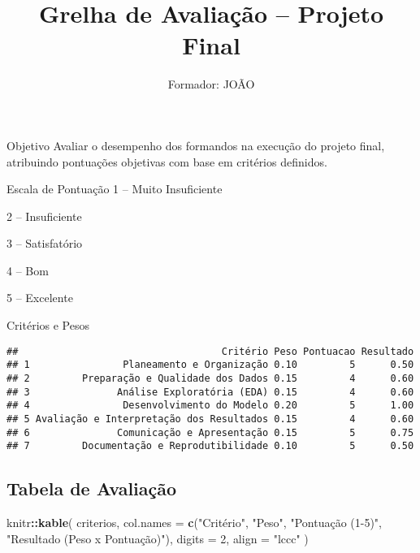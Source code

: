 \documentclass[
]{article}
\title{Grelha de Avaliação -- Projeto Final}
\author{Formador: JOÃO}
\date{}
\newenvironment{Shaded}{\begin{snugshade}}{\end{snugshade}}
\newcommand{\AttributeTok}[1]{\textcolor[rgb]{0.13,0.29,0.53}{#1}}
\newcommand{\DecValTok}[1]{\textcolor[rgb]{0.00,0.00,0.81}{#1}}
\newcommand{\FunctionTok}[1]{\textcolor[rgb]{0.13,0.29,0.53}{\textbf{#1}}}
\newcommand{\NormalTok}[1]{#1}
\newcommand{\SpecialCharTok}[1]{\textcolor[rgb]{0.81,0.36,0.00}{\textbf{#1}}}
\newcommand{\StringTok}[1]{\textcolor[rgb]{0.31,0.60,0.02}{#1}}
\begin{document}
\maketitle

Objetivo Avaliar o desempenho dos formandos na execução do projeto
final, atribuindo pontuações objetivas com base em critérios definidos.

Escala de Pontuação 1 -- Muito Insuficiente

2 -- Insuficiente

3 -- Satisfatório

4 -- Bom

5 -- Excelente

Critérios e Pesos

\begin{verbatim}
##                                   Critério Peso Pontuacao Resultado
## 1                Planeamento e Organização 0.10         5      0.50
## 2         Preparação e Qualidade dos Dados 0.15         4      0.60
## 3               Análise Exploratória (EDA) 0.15         4      0.60
## 4                Desenvolvimento do Modelo 0.20         5      1.00
## 5 Avaliação e Interpretação dos Resultados 0.15         4      0.60
## 6               Comunicação e Apresentação 0.15         5      0.75
## 7         Documentação e Reprodutibilidade 0.10         5      0.50
\end{verbatim}

\subsection{Tabela de Avaliação}\label{tabela-de-avaliauxe7uxe3o}

\begin{Shaded}
\begin{Highlighting}[]
\NormalTok{knitr}\SpecialCharTok{::}\FunctionTok{kable}\NormalTok{(}
\NormalTok{  criterios,}
  \AttributeTok{col.names =} \FunctionTok{c}\NormalTok{(}\StringTok{"Critério"}\NormalTok{, }\StringTok{"Peso"}\NormalTok{, }\StringTok{"Pontuação (1{-}5)"}\NormalTok{, }\StringTok{"Resultado (Peso x Pontuação)"}\NormalTok{),}
  \AttributeTok{digits =} \DecValTok{2}\NormalTok{,}
  \AttributeTok{align =} \StringTok{"lccc"}
\NormalTok{)}
\end{Highlighting}
\end{Shaded}
\end{document}
